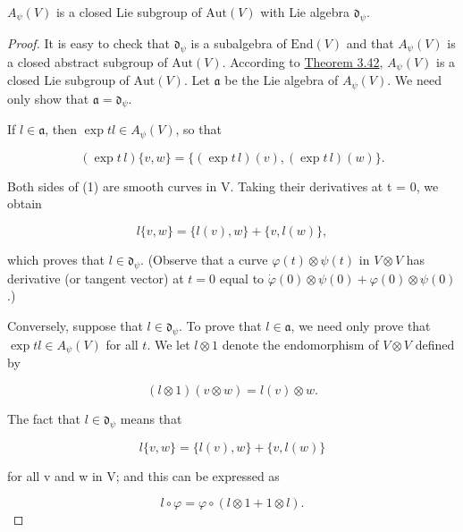 \begin{theorem}\label{thm:3.54}
$A_{\psi}(V)$ is a closed Lie subgroup of $\mathrm{Aut}(V)$ with Lie algebra $\mathfrak{d}_{\psi}$.

\end{theorem}

\begin{proof}
It is easy to check that $\mathfrak{d}_{\psi}$ is a subalgebra of $\mathrm{End}(V)$ and that $A_{\psi}(V)$ is a closed abstract subgroup of $\mathrm{Aut}(V)$. According to \hyperref[thm:3.42]{Theorem 3.42}, $A_{\psi}(V)$ is a closed Lie subgroup of $\mathrm{Aut}(V)$. Let $\mathfrak{a}$ be the Lie algebra of $A_{\psi}(V)$. We need only show that $\mathfrak{a}=\mathfrak{d}_{\psi}$.

If  $ l\in\mathfrak{a} $, then  $ \exp t l \in A_{\psi}(V) $, so that

\begin{equation}
\tag{1}\label{eq:3.54:1}
(\exp t\,l)\{v,w\}=\{(\exp t\,l)(v),(\exp t\,l)(w)\}.
\end{equation}

Both sides of (1) are smooth curves in V. Taking their derivatives at t = 0, we obtain

\begin{equation}
\tag{2}\label{eq:3.54:2}
l\{v,w\}=\{l(v),w\}+\{v,l(w)\},
\end{equation}

which proves that  $ l\in\mathfrak{d}_{\psi} $. (Observe that a curve  $ \varphi(t) \otimes \psi(t) $ in  $ V \otimes V $ has derivative (or tangent vector) at  $ t = 0 $ equal to  $ \dot{\varphi}(0) \otimes \psi(0) + \varphi(0) \otimes \psi(0) $.)

Conversely, suppose that  $ l\in\mathfrak{d}_{\psi} $. To prove that  $ l\in\mathfrak{a} $, we need only prove that  $ \exp t l \in A_{\psi}(V) $ for all  $ t $. We let  $ l \otimes 1 $ denote the endomorphism of  $ V \otimes V $ defined by

\[
(l\otimes1)(v\otimes w)=l(v)\otimes w.
\]

The fact that  $ l\in\mathfrak{d}_{\psi} $ means that

\begin{equation}
\tag{3}\label{eq:3.54:3}
l\{v,w\}=\{l(v),w\}+\{v,l(w)\}
\end{equation}

for all v and w in V; and this can be expressed as

\begin{equation}
\tag{4}\label{eq:3.54:4}
l\circ\varphi=\varphi\circ(l\otimes1+1\otimes l).
\end{equation}


\end{proof}
